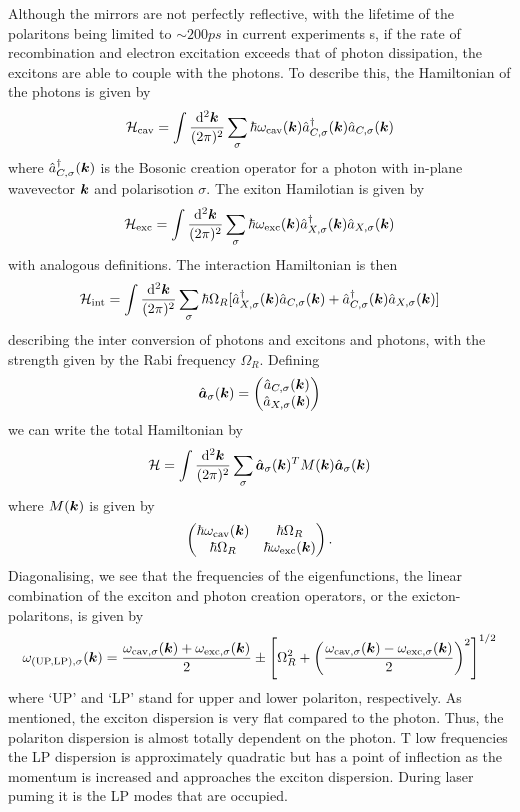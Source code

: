 Although the mirrors are not perfectly reflective,
with the lifetime of the polaritons being limited to $\sim 200 ps$ in current experiments \cite{2014arXiv1408.1680S}s, if the rate of recombination and electron excitation exceeds that of photon dissipation,
the excitons are able to couple with the photons. To describe this, the Hamiltonian of the photons is given by 
\[
\mathcal{H}_{\text{cav}} = \int \frac{\dd[2]{\boldsymbol{k}}}{(2\pi)^2} \sum_\sigma 
\hbar\omega_{\text{cav}}(\boldsymbol{k})\hat{a}^\dagger_{C,\sigma}(\boldsymbol{k})\hat{a}_{C,\sigma}(\boldsymbol{k})
\]
where $\hat{a}^\dagger_{C,\sigma}(\boldsymbol{k})$ is the Bosonic creation operator for a photon with in-plane wavevector $\boldsymbol{k}$ and polarisotion $\sigma.$ The exiton Hamilotian is given by 
\[
\mathcal{H}_{\text{exc}} = \int \frac{\dd[2]{\boldsymbol{k}}}{(2\pi)^2} \sum_\sigma 
\hbar\omega_{\text{exc}}(\boldsymbol{k})\hat{a}^\dagger_{X,\sigma}(\boldsymbol{k})\hat{a}_{X,\sigma}(\boldsymbol{k})
\]
with analogous definitions. The interaction Hamiltonian is then 
\[
\mathcal{H}_{\text{int}} = \int \frac{\dd[2]{\boldsymbol{k}}}{(2\pi)^2} \sum_\sigma \hbar \Omega_R [ \hat{a}^\dagger_{X,\sigma}(\boldsymbol{k})\hat{a}_{C,\sigma}(\boldsymbol{k}) + \hat{a}^\dagger_{C,\sigma}(\boldsymbol{k})\hat{a}_{X,\sigma}(\boldsymbol{k})]
\]
describing the inter conversion of photons and excitons and photons, with the strength given by the Rabi frequency $\Omega_R$. Defining 
\[
\hat{\boldsymbol{a}}_\sigma(\boldsymbol{k}) = 
\begin{pmatrix}
\hat{a}_{C, \sigma}(\boldsymbol{k}) \\
\hat{a}_{X,\sigma}(\boldsymbol{k})
\end{pmatrix}
\]
we can write the total Hamiltonian by 
\[
\mathcal{H} = \int \frac{\dd[2]{\boldsymbol{k}}}{(2\pi)^2} \sum_\sigma \hat{\boldsymbol{a}}_\sigma (\boldsymbol{k})^TM(\boldsymbol{k}) \hat{\boldsymbol{a}}_\sigma(\boldsymbol{k})
\]
where $M(\boldsymbol{k})$ is given by 
\[
\begin{pmatrix}
\hbar\omega_{\text{cav}}(\boldsymbol{k}) & \hbar \Omega_R \\
\hbar \Omega_R & \hbar\omega_{\text{exc}}(\boldsymbol{k})
\end{pmatrix}.
\]
Diagonalising, we see that the frequencies of the eigenfunctions, the linear combination of the exciton and photon creation operators, or the exicton-polaritons, is given by
\[
\omega_{\text{(UP,LP)},\sigma}(\boldsymbol{k}) = \frac{\omega_{\text{cav},\sigma}(\boldsymbol{k}) + \omega_{\text{exc},\sigma}(\boldsymbol{k})}{2} \pm \left[ \Omega_R^2 + \left(\frac{\omega_{\text{cav},\sigma}(\boldsymbol{k}) - \omega_{\text{exc},\sigma}(\boldsymbol{k})}{2}\right)^2\right]^{1/2}
\]
where `UP' and `LP' stand for upper and lower polariton, respectively. As mentioned, the exciton dispersion is very flat compared to the photon. Thus, the polariton dispersion is almost totally dependent on the photon. T low frequencies the LP dispersion is approximately quadratic but has a point of inflection as the momentum is increased and approaches the exciton dispersion. During laser puming it is the LP modes that are occupied. 

